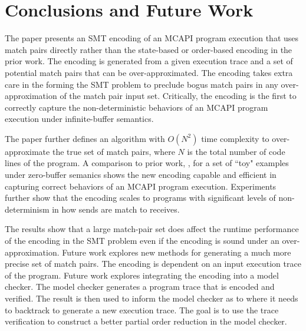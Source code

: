 \section{Conclusions and Future Work}
The paper presents an SMT encoding of an MCAPI program execution that
uses match pairs directly rather than the state-based or order-based
encoding in the prior work. The encoding is generated from a given
execution trace and a set of potential match pairs that can be
over-approximated. The encoding takes extra care in the forming
the SMT problem to preclude bogus match pairs in any
over-approximation of the match pair input set. Critically, the
encoding is the first to correctly capture the non-deterministic
behaviors of an MCAPI program execution under infinite-buffer
semantics.

The paper further defines an algorithm with $O(N^2)$ time complexity
to over-approximate the true set of match pairs, where $N$ is the
total number of code lines of the program. A comparison to prior work,
\cite{elwakil:padtad10}, for a set of ``toy" examples under
zero-buffer semanics shows the new encoding capable and efficient in
capturing correct behaviors of an MCAPI program execution. Experiments
further show that the encoding scales to programs with significant levels of
non-determinism in how sends are match to receives.

The results show that a large match-pair set does affect the runtime
performance of the encoding in the SMT problem even if the encoding is
sound under an over-approximation. Future work explores new methods
for generating a much more precise set of match pairs. The encoding is
dependent on an input execution trace of the program. Future work
explores integrating the encoding into a model checker. The model
checker generates a program trace that is encoded and verified. The
result is then used to inform the model checker as to where it needs
to backtrack to generate a new execution trace. The goal is to use the
trace verification to construct a better partial order reduction in
the model checker.


